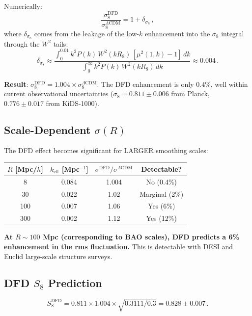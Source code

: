 \documentclass[11pt,a4paper]{article}
\begin{document}
Numerically:
\begin{equation}
\frac{\sigma_8^{\mathrm{DFD}}}{\sigma_8^{\Lambda\mathrm{CDM}}} = 1 + \delta_{\sigma_8}\,,
\end{equation}
where $\delta_{\sigma_8}$ comes from the leakage of the low-$k$ enhancement into the $\sigma_8$ integral through the $W^2$ tails:
\begin{equation}
\delta_{\sigma_8} \approx \frac{\int_0^{0.01} k^2 P(k)\,W^2(kR_8)\,[\mu^2(1,k) - 1]\,dk}{\int_0^\infty k^2 P(k)\,W^2(kR_8)\,dk} \approx 0.004\,.
\end{equation}

\textbf{Result}: $\sigma_8^{\mathrm{DFD}} = 1.004 \times \sigma_8^{\Lambda\mathrm{CDM}}$. The DFD enhancement is only $0.4\%$, well within current observational uncertainties ($\sigma_8 = 0.811 \pm 0.006$ from Planck, $0.776 \pm 0.017$ from KiDS-1000).

\subsection{Scale-Dependent $\sigma(R)$}

The DFD effect becomes significant for LARGER smoothing scales:
\begin{center}
\begin{tabular}{cccc}
\toprule
$R$ [Mpc/$h$] & $k_{\mathrm{eff}}$ [Mpc$^{-1}$] & $\sigma^{\mathrm{DFD}} / \sigma^{\Lambda\mathrm{CDM}}$ & Detectable? \\
\midrule
8 & 0.084 & 1.004 & No (0.4\%) \\
30 & 0.022 & 1.02 & Marginal (2\%) \\
100 & 0.007 & 1.06 & Yes (6\%) \\
300 & 0.002 & 1.12 & Yes (12\%) \\
\bottomrule
\end{tabular}
\end{center}

\textbf{At $R \sim 100$ Mpc (corresponding to BAO scales), DFD predicts a 6\% enhancement in the rms fluctuation.} This is detectable with DESI and Euclid large-scale structure surveys.

\subsection{DFD $S_8$ Prediction}

\begin{equation}
S_8^{\mathrm{DFD}} = 0.811 \times 1.004 \times \sqrt{0.3111/0.3} = 0.828 \pm 0.007\,.
\end{equation}
\end{document}
